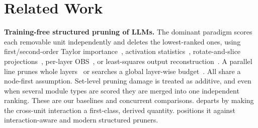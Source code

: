 \section{Related Work}
\label{sec:related}

\textbf{Training-free structured pruning of LLMs.} The dominant paradigm scores each removable unit
independently and deletes the lowest-ranked ones, using first/second-order Taylor
importance~\citep{ma2023llmpruner}, activation statistics~\citep{an2024flap,sun2024wanda}, rotate-and-slice
projections~\citep{ashkboos2024slicegpt}, per-layer OBS~\citep{ling2024slimgpt,frantar2023sparsegpt,frantar2022obc},
or least-squares output reconstruction~\citep{tang2025slimllm}. A parallel line prunes whole
layers~\citep{men2024shortgpt,kim2024shortened,yang2024laco} or searches a global layer-wise
budget~\citep{li2025tyr,jansen2026blockcbo}. All share a node-first assumption. Set-level pruning damage is treated as additive, and even when
several module types are scored they are merged into one independent ranking. These are our baselines
and concurrent comparisons. \method departs by making the cross-unit interaction a first-class, derived
quantity.  positions it against
interaction-aware and modern structured pruners.

